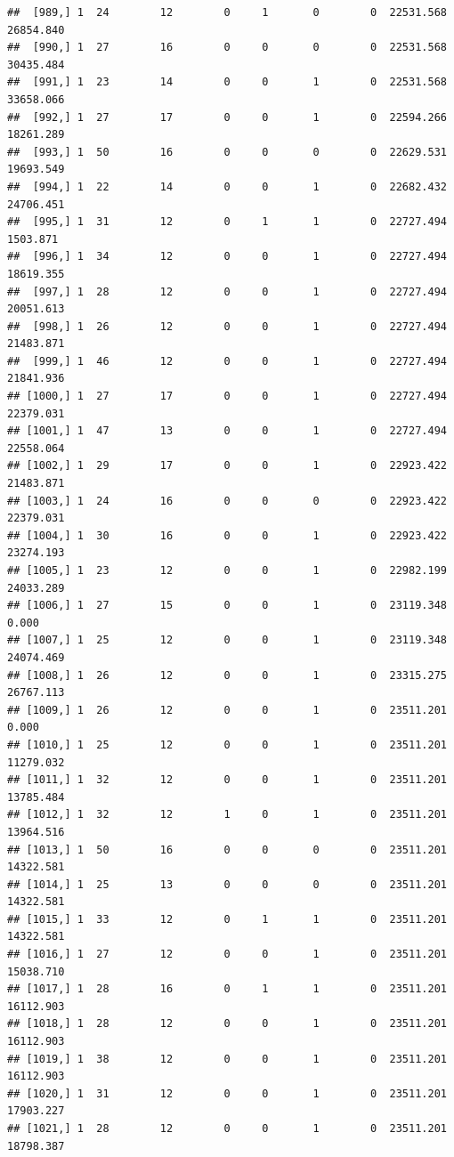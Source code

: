 \documentclass[
]{article}
\begin{document}
\begin{verbatim}
##  [989,] 1  24        12        0     1       0        0  22531.568  26854.840
##  [990,] 1  27        16        0     0       0        0  22531.568  30435.484
##  [991,] 1  23        14        0     0       1        0  22531.568  33658.066
##  [992,] 1  27        17        0     0       1        0  22594.266  18261.289
##  [993,] 1  50        16        0     0       0        0  22629.531  19693.549
##  [994,] 1  22        14        0     0       1        0  22682.432  24706.451
##  [995,] 1  31        12        0     1       1        0  22727.494   1503.871
##  [996,] 1  34        12        0     0       1        0  22727.494  18619.355
##  [997,] 1  28        12        0     0       1        0  22727.494  20051.613
##  [998,] 1  26        12        0     0       1        0  22727.494  21483.871
##  [999,] 1  46        12        0     0       1        0  22727.494  21841.936
## [1000,] 1  27        17        0     0       1        0  22727.494  22379.031
## [1001,] 1  47        13        0     0       1        0  22727.494  22558.064
## [1002,] 1  29        17        0     0       1        0  22923.422  21483.871
## [1003,] 1  24        16        0     0       0        0  22923.422  22379.031
## [1004,] 1  30        16        0     0       1        0  22923.422  23274.193
## [1005,] 1  23        12        0     0       1        0  22982.199  24033.289
## [1006,] 1  27        15        0     0       1        0  23119.348      0.000
## [1007,] 1  25        12        0     0       1        0  23119.348  24074.469
## [1008,] 1  26        12        0     0       1        0  23315.275  26767.113
## [1009,] 1  26        12        0     0       1        0  23511.201      0.000
## [1010,] 1  25        12        0     0       1        0  23511.201  11279.032
## [1011,] 1  32        12        0     0       1        0  23511.201  13785.484
## [1012,] 1  32        12        1     0       1        0  23511.201  13964.516
## [1013,] 1  50        16        0     0       0        0  23511.201  14322.581
## [1014,] 1  25        13        0     0       0        0  23511.201  14322.581
## [1015,] 1  33        12        0     1       1        0  23511.201  14322.581
## [1016,] 1  27        12        0     0       1        0  23511.201  15038.710
## [1017,] 1  28        16        0     1       1        0  23511.201  16112.903
## [1018,] 1  28        12        0     0       1        0  23511.201  16112.903
## [1019,] 1  38        12        0     0       1        0  23511.201  16112.903
## [1020,] 1  31        12        0     0       1        0  23511.201  17903.227
## [1021,] 1  28        12        0     0       1        0  23511.201  18798.387

\end{verbatim}
\end{document}
